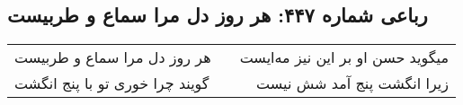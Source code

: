 \begin{center}
\section*{رباعی شماره ۴۴۷: هر روز دل مرا سماع و طربیست}
\label{sec:0447}
\begin{longtable}{l p{0.5cm} r}
هر روز دل مرا سماع و طربیست
&&
میگوید حسن او بر این نیز مه‌ایست
\\
گویند چرا خوری تو با پنج انگشت
&&
زیرا انگشت پنج آمد شش نیست
\\
\end{longtable}
\end{center}

